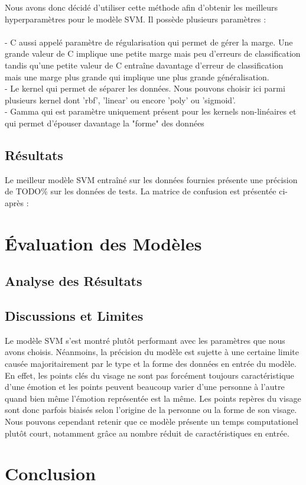 \documentclass{rapport}
\begin{document}
Nous avons donc décidé d'utiliser cette méthode afin d'obtenir les meilleurs hyperparamètres pour le modèle SVM. Il possède plusieurs paramètres :\\
\\- C aussi appelé paramètre de régularisation qui permet de gérer la marge. Une grande valeur de C implique une petite marge mais peu d'erreurs de classification
tandis qu'une petite valeur de C entraîne davantage d'erreur de classification mais une marge plus grande qui implique une plus grande généralisation.\\
- Le kernel qui permet de séparer les données. Nous pouvons choisir ici parmi plusieurs kernel dont 'rbf', 'linear' ou encore
'poly' ou 'sigmoid'.\\
- Gamma qui est paramètre uniquement présent pour les kernels non-linéaires et qui permet d'épouser davantage la "forme" des données
\subsection{Résultats}

Le meilleur modèle SVM entraîné sur les données fournies présente une précision de TODO\% sur les données de tests. La matrice de confusion est présentée ci-après :

\section{Évaluation des Modèles}
\subsection{Analyse des Résultats}

\subsection{Discussions et Limites}

Le modèle SVM s'est montré plutôt performant avec les paramètres que nous avons choisis. Néanmoins, la précision du modèle est sujette à une certaine limite causée
majoritairement par le type et la forme des données en entrée du modèle. En effet, les points clés du visage ne sont pas forcément toujours caractéristique d'une émotion
et les points peuvent beaucoup varier d'une personne à l'autre quand bien même l'émotion représentée est la même. Les points repères du visage sont donc parfois biaisés selon
l'origine de la personne ou la forme de son visage. Nous pouvons cependant retenir que ce modèle présente un temps computationel plutôt court, notamment grâce au nombre réduit
de caractéristiques en entrée.

\section{Conclusion}



\end{document}
